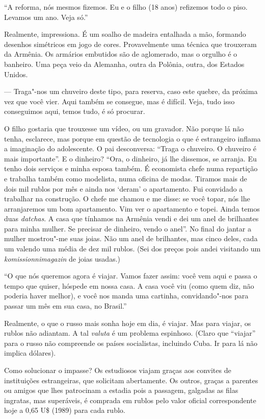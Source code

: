 ``A reforma, nós mesmos fizemos. Eu e o filho (18 anos) refizemos todo o
piso. Levamos um ano. Veja só.''

Realmente, impressiona. É um soalho de madeira entalhada a
mão, formando desenhos simétricos em jogo de cores. Provavelmente uma
técnica que trouxeram da Armênia. Os armários embutidos são de
aglomerado, mas o orgulho é o banheiro. Uma peça veio da Alemanha, outra
da Polônia, outra, dos Estados Unidos.

--- Traga"-nos um chuveiro deste tipo, para reserva, caso este quebre, da
próxima vez que você vier. Aqui também se consegue, mas é difícil. Veja,
tudo isso conseguimos aqui, temos tudo, é só procurar.

O filho gostaria que trouxesse um vídeo, ou um gravador. Não porque lá
não tenha, esclarece, mas porque em questão de tecnologia o que é
estrangeiro inflama a imaginação do adolescente. O pai desconversa:
``Traga o chuveiro. O chuveiro é mais importante''. E o dinheiro? ``Ora,
o dinheiro, já lhe dissemos, se arranja. Eu tenho dois serviços e minha
esposa também. É economista chefe numa repartição e trabalha também como
modelista, numa oficina de modas. Tiramos mais de dois mil rublos por
mês e ainda nos `deram' o apartamento. Fui convidado a trabalhar na
construção. O chefe me chamou e me disse: se você topar, nós lhe
arranjaremos um bom apartamento. Vim ver o apartamento e topei. Ainda
temos duas \emph{datchas}. A casa que tínhamos na Armênia vendi e dei um
anel de brilhantes para minha mulher. Se precisar de dinheiro, vendo o
anel''. No final do jantar a mulher mostrou"-me suas joias. Não um anel
de brilhantes, mas cinco deles, cada um valendo uma média de dez mil
rublos. (Sei dos preços pois andei visitando um \emph{komissionnimagazin}
de joias usadas.)

``O que nós queremos agora é viajar. Vamos fazer assim: você vem aqui e
passa o tempo que quiser, hóspede em nossa casa. A casa você viu (como
quem diz, não poderia haver melhor), e você nos manda uma cartinha,
convidando"-nos para passar um mês em sua casa, no Brasil.''

Realmente, o que o russo mais sonha hoje em dia, é viajar. Mas para
viajar, os rublos não adiantam. A tal \emph{valuta} é um problema
espinhoso. (Claro que ``viajar'' para o russo não compreende os países
socialistas, incluindo Cuba. Ir para lá não implica dólares).

Como solucionar o impasse? Os estudiosos viajam graças aos convites de
instituições estrangeiras, que solicitam abertamente. Os outros, graças
a parentes ou amigos que lhes patrocinam a estadia pois a passagem,
galgadas as filas ingratas, mas superáveis, é comprada em rublos pelo
valor oficial correspondente hoje a 0,65 U\$ (1989) para cada rublo.

